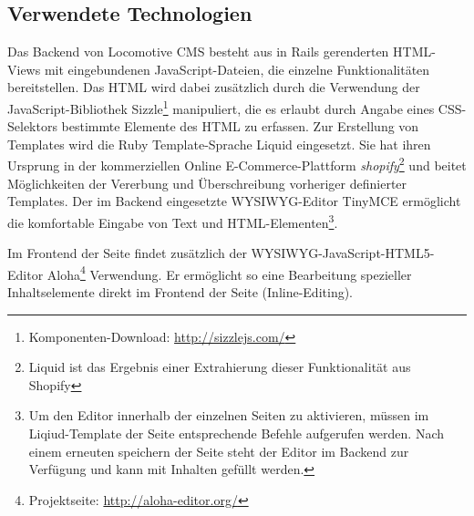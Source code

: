 \subsection{Verwendete Technologien}
\label{sec:TechnologienLocomotive}
Das Backend von Locomotive CMS besteht aus in Rails gerenderten HTML-Views mit eingebundenen JavaScript-Dateien, die einzelne Funktionalitäten bereitstellen. Das HTML wird dabei zusätzlich durch die Verwendung der JavaScript-Bibliothek Sizzle\footnote{Komponenten-Download: \href{http://sizzlejs.com/}{http://sizzlejs.com/}} manipuliert, die es erlaubt durch Angabe eines CSS-Selektors bestimmte Elemente des HTML zu erfassen.
Zur Erstellung von Templates wird die Ruby Template-Sprache Liquid eingesetzt. Sie hat ihren Ursprung in der kommerziellen Online E-Commerce-Plattform \emph{shopify}\footnote{Liquid ist das Ergebnis einer Extrahierung dieser Funktionalität aus Shopify} und beitet Möglichkeiten der Vererbung und Überschreibung vorheriger definierter Templates.
Der im Backend eingesetzte WYSIWYG-Editor TinyMCE ermöglicht die komfortable Eingabe von Text und HTML-Elementen\footnote{Um den Editor innerhalb der einzelnen Seiten zu aktivieren, müssen im Liqiud-Template der Seite entsprechende Befehle aufgerufen werden. Nach einem erneuten speichern der Seite steht der Editor im Backend zur Verfügung und kann mit Inhalten gefüllt werden.}.


Im Frontend der Seite findet zusätzlich der WYSIWYG-JavaScript-HTML5-Editor Aloha\footnote{Projektseite: \href{http://aloha-editor.org/}{http://aloha-editor.org/}} Verwendung. Er ermöglicht so eine Bearbeitung spezieller Inhaltselemente direkt im Frontend der Seite (Inline-Editing).

\newpage
